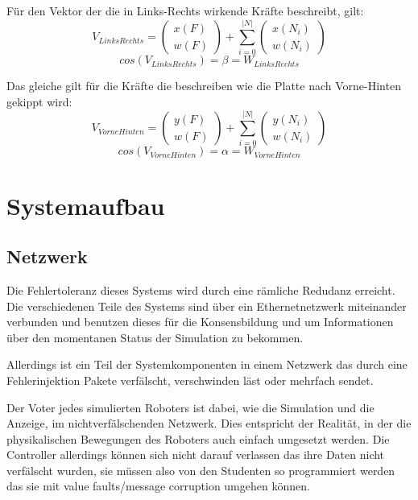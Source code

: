 ﻿\documentclass[
    12pt,
    bibliography=totoc,
    ngerman
]{scrartcl}
\begin{document}
F{\"{u}}r den Vektor der die in Links-Rechts wirkende Kr{\"{a}}fte beschreibt, gilt:
$$ V_{LinksRechts} = \begin{pmatrix}x(F) \\ w(F) \end{pmatrix} + \sum_{i=0}^{|N|} \begin{pmatrix} x(N_i) \\ w(N_i) \end{pmatrix} $$
$$ cos(V_{LinksRechts}) = \beta = W_{LinksRechts} $$

Das gleiche gilt f{\"{u}}r die Kr{\"{a}}fte die beschreiben wie die Platte nach Vorne-Hinten gekippt wird:
$$ V_{VorneHinten} = \begin{pmatrix}y(F) \\ w(F) \end{pmatrix} + \sum_{i=0}^{|N|} \begin{pmatrix} y(N_i) \\ w(N_i) \end{pmatrix} $$
$$ cos(V_{VorneHinten}) = \alpha = W_{VorneHinten} $$

\clearpage
\section{Systemaufbau}

\subsection{Netzwerk}\label{network}
Die Fehlertoleranz dieses Systems wird durch eine r{\"{a}}mliche Redudanz erreicht. Die verschiedenen Teile des Systems sind {\"{u}}ber ein Ethernetnetzwerk miteinander verbunden und benutzen dieses
f{\"{u}}r die Konsensbildung und um Informationen {\"{u}}ber den momentanen Status der Simulation zu bekommen.

Allerdings ist ein Teil der Systemkomponenten in einem Netzwerk das durch eine Fehlerinjektion Pakete verf{\"{a}}lscht, verschwinden l{\"{a}}st oder mehrfach sendet. 

Der Voter jedes simulierten Roboters ist dabei, wie die Simulation und die Anzeige, im nichtverf{\"{a}}lschenden Netzwerk. Dies entspricht der Realit{\"{a}}t, in der die physikalischen Bewegungen
des Roboters auch einfach umgesetzt werden. Die Controller allerdings k{\"{o}}nnen sich nicht darauf verlassen das ihre Daten nicht verf{\"{a}}lscht wurden, sie m{\"{u}}ssen also von den Studenten so
programmiert werden das sie mit value faults/message corruption\cite{richling-ass} umgehen k{\"{o}}nnen.
\end{document}
